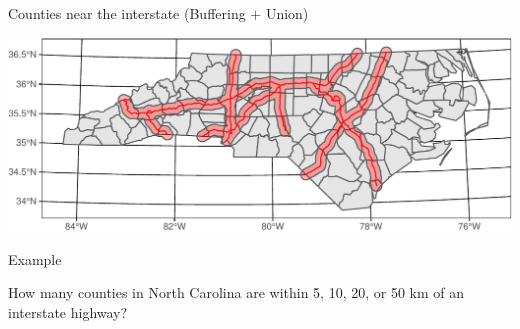 \documentclass[11pt,ignorenonframetext,]{beamer}
\newenvironment{Shaded}{}{}
\newcommand{\DataTypeTok}[1]{\textcolor[rgb]{0.56,0.13,0.00}{#1}}
\newcommand{\DecValTok}[1]{\textcolor[rgb]{0.25,0.63,0.44}{#1}}
\newcommand{\FloatTok}[1]{\textcolor[rgb]{0.25,0.63,0.44}{#1}}
\newcommand{\KeywordTok}[1]{\textcolor[rgb]{0.00,0.44,0.13}{\textbf{#1}}}
\newcommand{\NormalTok}[1]{#1}
\newcommand{\OperatorTok}[1]{\textcolor[rgb]{0.40,0.40,0.40}{#1}}
\newcommand{\StringTok}[1]{\textcolor[rgb]{0.25,0.44,0.63}{#1}}
\let\oldShaded\Shaded
\let\endoldShaded\endShaded
\renewenvironment{Shaded}{\footnotesize\begin{spacing}{0.9}\oldShaded}{\endoldShaded\end{spacing}}
\let\oldverbatim\verbatim
\let\endoldverbatim\endverbatim
\newcommand{\scriptoutput}{
  \renewenvironment{Shaded}{\scriptsize\begin{spacing}{0.9}\oldShaded}{\endoldShaded\end{spacing}}
  \renewenvironment{verbatim}{\scriptsize\begin{spacing}{0.9}\oldverbatim}{\endoldverbatim\end{spacing}}
}
\begin{document}
\begin{frame}[fragile,t]{Counties near the interstate (Buffering +
Union)}
\protect\hypertarget{counties-near-the-interstate-buffering-union}{}

\scriptoutput

\begin{Shaded}
\end{Shaded}

\begin{center}\includegraphics[width=\textwidth]{Lec16_files/figure-beamer/unnamed-chunk-33-1} \end{center}

\end{frame}

\begin{frame}[t]{Example}
\protect\hypertarget{example}{}

How many counties in North Carolina are within 5, 10, 20, or 50 km of an
interstate highway?

\pause

\end{frame}
\end{document}
